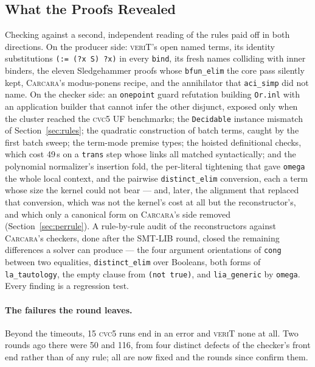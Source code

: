 \documentclass[runningheads]{llncs}
\newcommand{\cvcv}{\textsc{cvc5}\xspace}
\newcommand{\carcara}{\textsc{Carcara}\xspace}
\newcommand{\verit}{\textsc{veriT}\xspace}
\newcommand{\rulename}[1]{\texttt{#1}}
\begin{document}
\subsection{What the Proofs Revealed}
\label{sec:revealed}

Checking against a second, independent reading of the rules paid off in both
directions. On the producer side: \verit's open named terms, its identity
substitutions \texttt{(:= (?x S) ?x)} in every \rulename{bind}, its fresh
names colliding with inner binders, the eleven Sledgehammer proofs whose
\rulename{bfun\_elim} the core pass silently kept, \carcara's modus-ponens
recipe, and the annihilator that \rulename{aci\_simp} did not name. On the
checker side: an \rulename{onepoint} guard refutation building
\lstinline{Or.inl} with an application builder that cannot infer the other
disjunct, exposed only when the cluster reached the \cvcv UF benchmarks; the
\texttt{Decidable} instance mismatch of Section~\ref{sec:rules}; the
quadratic construction of batch terms, caught by the first batch sweep; the
term-mode premise types; the hoisted definitional checks, which cost 49\,s on
a \rulename{trans} step whose links all matched syntactically; and the
polynomial normalizer's insertion fold, the per-literal tightening that gave
\texttt{omega} the whole local context, and the pairwise
\rulename{distinct\_elim} conversion, each a term whose size the kernel could
not bear --- and, later, the alignment that replaced that conversion, which
was not the kernel's cost at all but the reconstructor's, and which only a
canonical form on \carcara's side removed (Section~\ref{sec:perrule}).
A rule-by-rule audit of the reconstructors against \carcara's
checkers, done after the SMT-LIB round, closed the remaining differences a
solver can produce --- the four argument orientations of \rulename{cong}
between two equalities, \rulename{distinct\_elim} over Booleans, both forms
of \rulename{la\_tautology}, the empty clause from \texttt{(not true)}, and
\rulename{lia\_generic} by \texttt{omega}. Every finding is a regression
test.

\paragraph{The failures the round leaves.} Beyond the timeouts, 15 \cvcv runs
end in an error and \verit none at all. Two rounds ago there were 50 and 116,
from four distinct defects of the checker's front end rather than of any rule;
all are now fixed and the rounds since confirm them.
\end{document}
